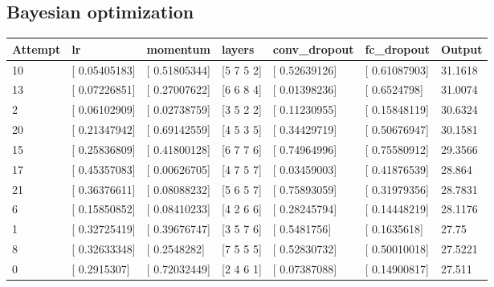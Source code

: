 \FloatBarrier

\subsection{Bayesian optimization}

\begin{table}[h]
    \centering
    \small
    \begin{tabular}{@{}lllllll@{}}
    \toprule
    \textbf{Attempt} & \textbf{lr}       & \textbf{momentum} & \textbf{layers} & \textbf{conv\_dropout} & \textbf{fc\_dropout} & \textbf{Output} \\ \midrule
    10               & {[} 0.05405183{]} & {[} 0.51805344{]} & {[}5 7 5 2{]}   & {[} 0.52639126{]}      & {[} 0.61087903{]}    & 31.1618         \\
    13               & {[} 0.07226851{]} & {[} 0.27007622{]} & {[}6 6 8 4{]}   & {[} 0.01398236{]}      & {[} 0.6524798{]}     & 31.0074         \\
    2                & {[} 0.06102909{]} & {[} 0.02738759{]} & {[}3 5 2 2{]}   & {[} 0.11230955{]}      & {[} 0.15848119{]}    & 30.6324         \\
    20               & {[} 0.21347942{]} & {[} 0.69142559{]} & {[}4 5 3 5{]}   & {[} 0.34429719{]}      & {[} 0.50676947{]}    & 30.1581         \\
    15               & {[} 0.25836809{]} & {[} 0.41800128{]} & {[}6 7 7 6{]}   & {[} 0.74964996{]}      & {[} 0.75580912{]}    & 29.3566         \\
    17               & {[} 0.45357083{]} & {[} 0.00626705{]} & {[}4 7 5 7{]}   & {[} 0.03459003{]}      & {[} 0.41876539{]}    & 28.864          \\
    21               & {[} 0.36376611{]} & {[} 0.08088232{]} & {[}5 6 5 7{]}   & {[} 0.75893059{]}      & {[} 0.31979356{]}    & 28.7831         \\
    6                & {[} 0.15850852{]} & {[} 0.08410233{]} & {[}4 2 6 6{]}   & {[} 0.28245794{]}      & {[} 0.14448219{]}    & 28.1176         \\
    1                & {[} 0.32725419{]} & {[} 0.39676747{]} & {[}3 5 7 6{]}   & {[} 0.5481756{]}       & {[} 0.1635618{]}     & 27.75           \\
    8                & {[} 0.32633348{]} & {[} 0.2548282{]}  & {[}7 5 5 5{]}   & {[} 0.52830732{]}      & {[} 0.50010018{]}    & 27.5221         \\
    0                & {[} 0.2915307{]}  & {[} 0.72032449{]} & {[}2 4 6 1{]}   & {[} 0.07387088{]}      & {[} 0.14900817{]}    & 27.511          \\

\end{tabular}
\end{table}
